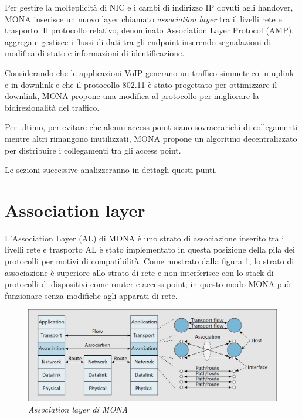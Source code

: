 \documentclass[12pt,a4paper,openright,twoside]{book}
\begin{document}
Per gestire la molteplicità di NIC e i cambi di indirizzo IP dovuti
agli handover, MONA inserisce un nuovo layer chiamato
\emph{association layer} tra il livelli rete e trasporto. Il
protocollo relativo, denominato Association Layer Protocol (AMP),
aggrega e gestisce i flussi di dati tra gli endpoint inserendo
segnalazioni di modifica di stato e informazioni di identificazione.

Considerando che le applicazioni VoIP generano un traffico simmetrico
in uplink e in downlink e che il protocollo 802.11 è stato progettato
per ottimizzare il downlink, MONA propone una modifica al protocollo
per migliorare la bidirezionalità del traffico.

Per ultimo, per evitare che alcuni access point siano sovraccarichi di
collegamenti mentre altri rimangono inutilizzati, MONA propone un
algoritmo decentralizzato per distribuire i collegamenti tra gli
access point.

Le sezioni successive analizzeranno in dettagli questi punti.

\section{Association layer}

L'Association Layer (AL) di MONA è uno strato di associazione inserito
tra i livelli rete e trasporto AL è stato implementato in questa
posizione della pila dei protocolli per motivi di compatibilità. Come
mostrato dalla figura \ref{fig:mona-association-layer}, lo strato di
associazione è superiore allo strato di rete e non interferisce con lo
stack di protocolli di dispositivi come router e access point; in
questo modo MONA può funzionare senza modifiche agli apparati di rete.

\begin{figure}[tb]
\centering
\includegraphics[width=\textwidth]{img/mona-association-layer}
\caption{\em Association layer di MONA}
\label{fig:mona-association-layer}
\end{figure}
\end{document}
